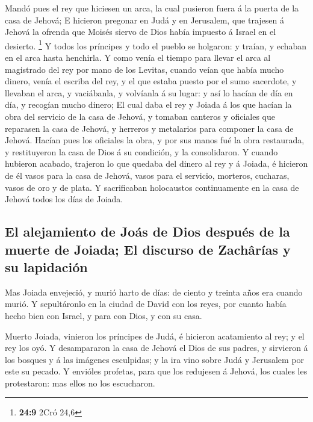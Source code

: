  Mandó pues el rey que hiciesen un arca, la cual pusieron
fuera á la puerta de la casa de Jehová;  E hicieron
pregonar en Judá y en Jerusalem, que trajesen á Jehová la ofrenda que
Moisés siervo de Dios había impuesto á Israel en el desierto.
\footnote{\textbf{24:9} 2Cró 24,6}  Y todos los príncipes
y todo el pueblo se holgaron: y traían, y echaban en el arca hasta
henchirla.  Y como venía el tiempo para llevar el arca al
magistrado del rey por mano de los Levitas, cuando veían que había mucho
dinero, venía el escriba del rey, y el que estaba puesto por el sumo
sacerdote, y llevaban el arca, y vaciábanla, y volvíanla á su lugar: y
así lo hacían de día en día, y recogían mucho dinero;  El
cual daba el rey y Joiada á los que hacían la obra del servicio de la
casa de Jehová, y tomaban canteros y oficiales que reparasen la casa de
Jehová, y herreros y metalarios para componer la casa de Jehová.
 Hacían pues los oficiales la obra, y por sus manos fué
la obra restaurada, y restituyeron la casa de Dios á su condición, y la
consolidaron.  Y cuando hubieron acabado, trajeron lo que
quedaba del dinero al rey y á Joiada, é hicieron de él vasos para la
casa de Jehová, vasos para el servicio, morteros, cucharas, vasos de oro
y de plata. Y sacrificaban holocaustos continuamente en la casa de
Jehová todos los días de Joiada.

\hypertarget{el-alejamiento-de-jouxe1s-de-dios-despuuxe9s-de-la-muerte-de-joiada-el-discurso-de-zachuxe2ruxedas-y-su-lapidaciuxf3n}{%
\subsection{El alejamiento de Joás de Dios después de la muerte de
Joiada; El discurso de Zachârías y su
lapidación}\label{el-alejamiento-de-jouxe1s-de-dios-despuuxe9s-de-la-muerte-de-joiada-el-discurso-de-zachuxe2ruxedas-y-su-lapidaciuxf3n}}

 Mas Joiada envejeció, y murió harto de días: de ciento y
treinta años era cuando murió.  Y sepultáronlo en la
ciudad de David con los reyes, por cuanto había hecho bien con Israel, y
para con Dios, y con su casa.

 Muerto Joiada, vinieron los príncipes de Judá, é
hicieron acatamiento al rey; y el rey los oyó.  Y
desampararon la casa de Jehová el Dios de sus padres, y sirvieron á los
bosques y á las imágenes esculpidas; y la ira vino sobre Judá y
Jerusalem por este su pecado.  Y envióles profetas, para
que los redujesen á Jehová, los cuales les protestaron: mas ellos no los
escucharon.

